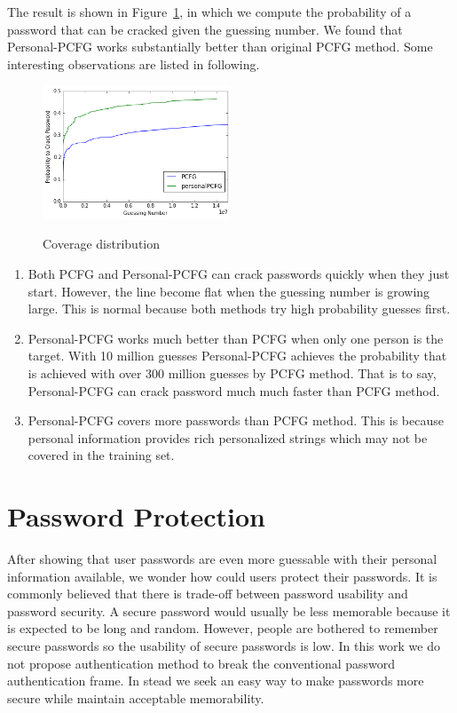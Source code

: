 \documentclass{sig-alternate}
\begin{document}
The result is shown in Figure~\ref{f3}, in which we compute the probability of a password that can be cracked given the guessing number. We found that Personal-PCFG works substantially better than original PCFG method. Some interesting observations are listed in following.

\begin{figure}[h!]
\centering
  \caption{Coverage distribution}{}
  \label{f3}
  \centering
    \includegraphics[width=0.5\textwidth]{fig/cmp}
\end{figure}

\begin{enumerate}[leftmargin=*]
\item Both PCFG and Personal-PCFG can crack passwords quickly when they just start. However, the line become flat when the guessing number is growing large. This is normal because both methods try high probability guesses first. 

\item Personal-PCFG works much better than PCFG when only one person is the target. With 10 million guesses Personal-PCFG achieves the probability that is achieved with over 300 million guesses by PCFG method. That is to say, Personal-PCFG can crack password much much faster than PCFG method. 

\item Personal-PCFG covers more passwords than PCFG method. This is because personal information provides rich personalized strings which may not  be covered in the training set.  

\end{enumerate}


\section{Password Protection}
After showing that user passwords are even more guessable with their personal information available, we wonder how could users protect their passwords. It is commonly believed that there is trade-off between password usability and password security. A secure password would usually be less memorable because it is expected to be long and random. However, people are bothered to remember secure passwords so the usability of secure passwords is low. In this work we do not propose authentication method to break the conventional password authentication frame. In stead we seek an easy way to make passwords more secure while maintain acceptable memorability.
\end{document}
